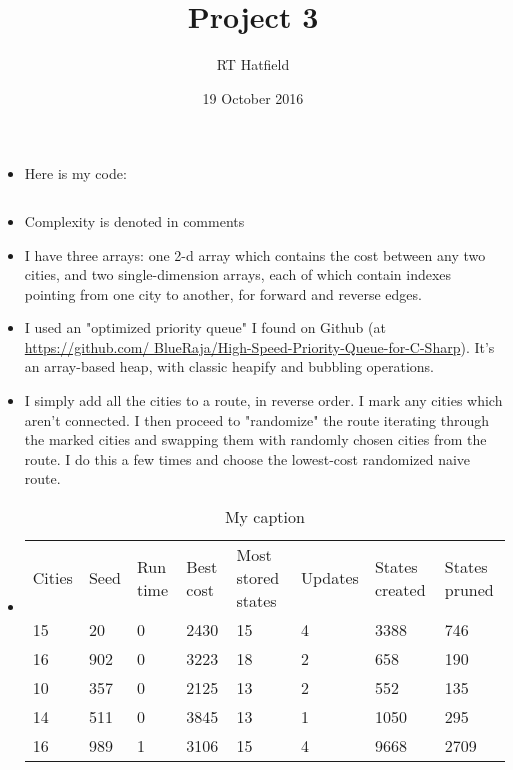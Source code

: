 \documentclass{article}
\title{Project 3}
\author{RT Hatfield}
\date{19 October 2016}
\begin{document}
\maketitle
\begin{itemize}
    \item Here is my code:
    \begin{lstlisting}
    \end{lstlisting}
    \item Complexity is denoted in comments
    \item I have three arrays: one 2-d array which contains the cost between any two cities, and two single-dimension 
arrays, each of which contain indexes pointing from one city to another, for forward and reverse edges.
    \item I used an "optimized priority queue" I found on Github (at \url{https://github.com/
        BlueRaja/High-Speed-Priority-Queue-for-C-Sharp}).  It's an array-based heap, with classic
        heapify and bubbling operations.
    \item I simply add all the cities to a route, in reverse order.  I mark any cities which aren't connected.  
I then proceed to "randomize" the route iterating through the marked cities and swapping them with randomly chosen
cities from the route.  I do this a few times and choose the lowest-cost randomized naive route. 
    \item 
\begin{table}[]
\centering
\caption{My caption}
\label{my-label}
\begin{tabular}{llllllll}
Cities  &   Seed    &   Run time    &   Best cost   &   Most stored states  &   Updates &   States created  &   States pruned   \\
15	    &   20      &	0           &  	2430        &  	15                  &  	4       &	3388            &	746             \\
16	    &   902	    &   0 	        &   3223        &	18                  &	2       &  	658             &	190             \\
10      &	357     &	0           & 	2125        &	13                  &	2       &	552	            &   135             \\
14      &	511     &	0           & 	3845        &	13                  &	1       &	1050            &	295             \\
16      &	989	    &   1           & 	3106        &	15                  &	4	    &   9668        	&   2709            \\

\end{tabular}
\end{table}
\end{itemize}
\end{document}
